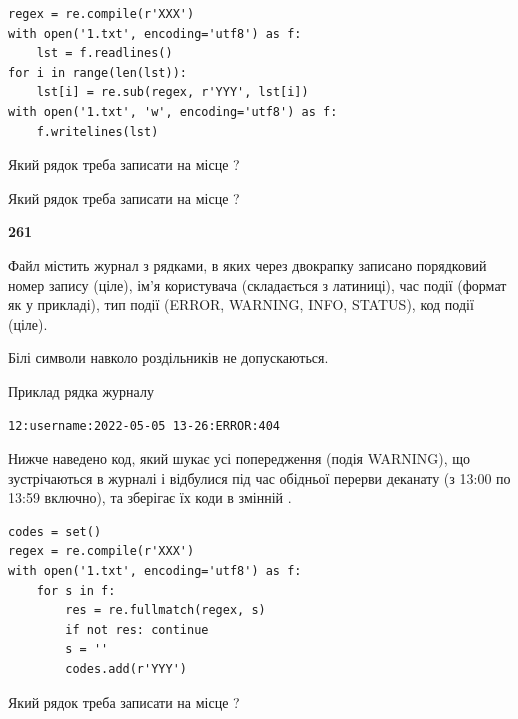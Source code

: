 \begin{verbatim}
regex = re.compile(r'XXX')
with open('1.txt', encoding='utf8') as f:
    lst = f.readlines()
for i in range(len(lst)):
    lst[i] = re.sub(regex, r'YYY', lst[i])
with open('1.txt', 'w', encoding='utf8') as f:
    f.writelines(lst)
\end{verbatim}









Який рядок треба записати на місце  ?\par
\vspace{5mm}


Який рядок треба записати на місце  ?\par


\newpage

{\begin {center}\textbf{ 261}\end {center}}\par
Файл  містить журнал з рядками, в яких через двокрапку записано поряд\-ко\-вий номер запису (ціле), ім'я користувача (складається з латиниці), час події (фор\-мат як у прикладі), тип події (ERROR, WARNING, INFO, STATUS), код події (ціле).

Білі символи навколо роздільників не допускаються.

Приклад рядка журналу



\begin{verbatim}
12:username:2022-05-05 13-26:ERROR:404
\end{verbatim}


Нижче наведено код, який шукає усі попередження (подія WARNING), що зустрі\-ча\-ються в журналі і відбулися під час обідньої перерви деканату (з 13:00 по 13:59 включно), та зберігає їх коди в змінній .



\begin{verbatim}
codes = set()
regex = re.compile(r'XXX')
with open('1.txt', encoding='utf8') as f:
    for s in f:
        res = re.fullmatch(regex, s)
        if not res: continue
        s = ''
        codes.add(r'YYY')
\end{verbatim}







Який рядок треба записати на місце  ?\par
\vspace{5mm}


